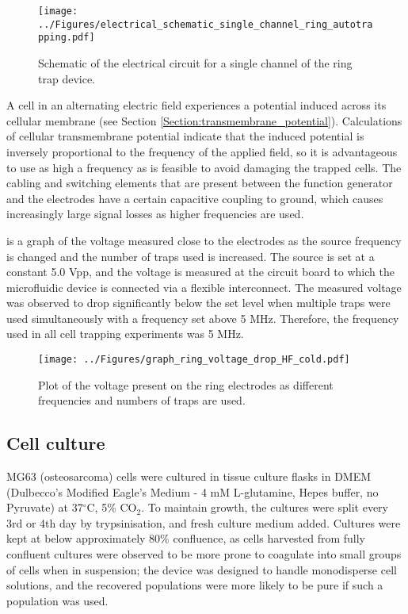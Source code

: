 \begin{figure}
	\centering
		\texttt{[image: ../Figures/electrical\_schematic\_single\_channel\_ring\_autotrapping.pdf]}
	\caption[The electrical circuit for a single channel of the ring trap device.]{Schematic of the electrical circuit for a single channel of the ring trap device.}
	\label{fig:electrical_schematic_single_channel_ring_autotrapping}
\end{figure}

A cell in an alternating electric field experiences a potential induced across its cellular membrane (see Section \ref{Section:transmembrane_potential}). Calculations of cellular transmembrane potential indicate that the induced potential is inversely proportional to the frequency of the applied field, so it is advantageous to use as high a frequency as is feasible to avoid damaging the trapped cells. The cabling and switching elements that are present between the function generator and the electrodes have a certain capacitive coupling to ground, which causes increasingly large signal losses as higher frequencies are used.

 is a graph of the voltage measured close to the electrodes as the source frequency is changed and the number of traps used is increased. The source is set at a constant 5.0 Vpp, and the voltage is measured at the circuit board to which the microfluidic device is connected via a flexible interconnect. The measured voltage was observed to drop significantly below the set level when multiple traps were used simultaneously with a frequency set above 5 MHz. Therefore, the frequency used in all cell trapping experiments was 5 MHz.

\begin{figure}
	\centering
		\texttt{[image: ../Figures/graph\_ring\_voltage\_drop\_HF\_cold.pdf]}
	\caption{Plot of the voltage present on the ring electrodes as different frequencies and numbers of traps are used.}
	\label{fig:graph_ring_voltage_drop_HF_cold}
\end{figure}


\subsection{Cell culture}

MG63 (osteosarcoma) cells were cultured in tissue culture flasks in DMEM (Dulbecco's Modified Eagle's Medium - 4 mM L-glutamine, Hepes buffer, no Pyruvate) at 37$^{\circ}$C, 5\% CO$_{2}$. To maintain growth, the cultures were split every 3rd or 4th day by trypsinisation, and fresh culture medium added. Cultures were kept at below approximately 80\% confluence, as cells harvested from fully confluent cultures were observed to be more prone to coagulate into small groups of cells when in suspension; the device was designed to handle monodisperse cell solutions, and the recovered populations were more likely to be pure if such a population was used.

